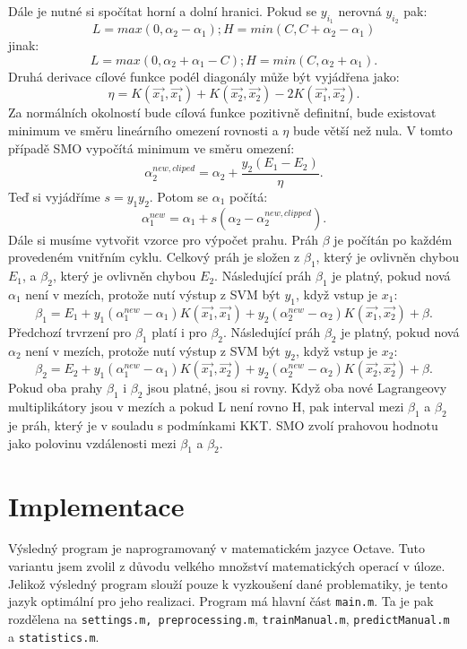 \documentclass[a4]{article}
\begin{document}
\noindent Dále je nutné si spočítat horní a dolní hranici. Pokud se $y_{i_1}$ nerovná $y_{i_2}$ pak:
$$
L=max(0,\alpha_2 - \alpha_1) ; H=min(C, C+\alpha_2 - \alpha_1)
$$
jinak:
$$
L=max(0,\alpha_2 + \alpha_1 - C) ; H=min(C, \alpha_2 + \alpha_1).
$$
\noindent Druhá derivace cílové funkce podél diagonály může být vyjádřena jako:
$$
\eta=K(\vec{x_1},\vec{x_1}) + K(\vec{x_2},\vec{x_2}) -2K(\vec{x_1},\vec{x_2}).
$$
\noindent Za normálních okolností bude cílová funkce pozitivně definitní, bude existovat
minimum ve směru lineárního omezení rovnosti a $\eta$ bude větší než nula. V
tomto případě SMO vypočítá minimum ve směru omezení:
$$
\alpha_{2}^{new,cliped} = \alpha_{2}+\frac{y_{2}(E_{1}-E_{2})}{\eta}.
$$
\noindent Teď si vyjádříme $s=y_{1}y_{2}$. Potom se $\alpha_1$ počítá:
$$
\alpha_{1}^{new}=\alpha_{1}+s(\alpha_{2}-\alpha_{2}^{new,clipped}).
$$
\noindent Dále si musíme vytvořit vzorce pro výpočet prahu. Práh $\beta$ je počítán po každém provedeném vnitřním cyklu. Celkový práh je složen z $\beta_1$, který  je ovlivněn chybou $E_1$, a $\beta_2$, který je ovlivněn chybou $E_2$. Následující práh $\beta_1$ je platný, pokud nová $\alpha_{1}$ není v mezích, protože nutí výstup z SVM být $y_1$, když vstup je $x_1$:
$$
\beta_1=E_1+y_1(\alpha_1^{new}-\alpha_{1})K(\vec{x_1},\vec{x_1})+y_2(\alpha_2^{new}-\alpha_2)K(\vec{x_1},\vec{x_2})+\beta.
$$
\noindent Předchozí trvrzení pro $\beta_1$ platí i pro $\beta_2$. Následující práh $\beta_2$ je platný, pokud nová $\alpha_{2}$ není v mezích, protože nutí výstup z SVM být $y_2$, když vstup je $x_2$:
$$
\beta_2=E_2+y_1(\alpha_1^{new}-\alpha_{1})K(\vec{x_1},\vec{x_2})+y_2(\alpha_2^{new}-\alpha_2)K(\vec{x_2},\vec{x_2})+\beta.
$$
\noindent Pokud oba prahy $\beta_1$ i $\beta_2$ jsou platné, jsou si rovny. Když oba nové Lagrangeovy multiplikátory jsou v mezích a pokud L není rovno H, pak interval mezi $\beta_1$ a $\beta_2$ je práh, který je v souladu s podmínkami KKT. SMO zvolí prahovou hodnotu jako polovinu vzdálenosti mezi $\beta_1$ a $\beta_2$.\cite{smo_platt_original}

\section{Implementace}
Výsledný program je naprogramovaný v matematickém jazyce Octave. Tuto variantu jsem zvolil z důvodu velkého množství matematických operací v úloze. Jelikož výsledný program slouží pouze k vyzkoušení dané problematiky, je tento jazyk optimální pro jeho realizaci. Program má hlavní část \texttt{main.m}. Ta je pak rozdělena na \texttt{settings.m, preprocessing.m}, \texttt{trainManual.m}, \texttt{predictManual.m} a \texttt{statistics.m}.
\end{document}
